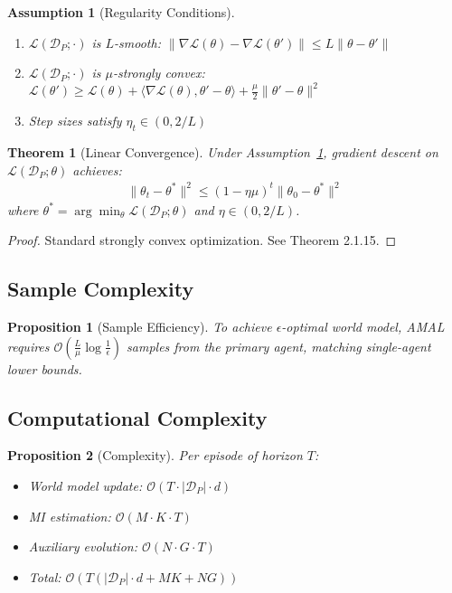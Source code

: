 \documentclass[12pt, a4paper]{article}
\newtheorem{theorem}{Theorem}
\newtheorem{proposition}{Proposition}
\newtheorem{assumption}{Assumption}
\begin{document}
\begin{assumption}[Regularity Conditions]\label{ass:regularity}
\begin{enumerate}
\item $\mathcal{L}(\mathcal{D}_P; \cdot)$ is $L$-smooth: $\|\nabla \mathcal{L}(\theta) - \nabla \mathcal{L}(\theta')\| \leq L\|\theta - \theta'\|$
\item $\mathcal{L}(\mathcal{D}_P; \cdot)$ is $\mu$-strongly convex: $\mathcal{L}(\theta') \geq \mathcal{L}(\theta) + \langle\nabla\mathcal{L}(\theta), \theta'-\theta\rangle + \frac{\mu}{2}\|\theta'-\theta\|^2$
\item Step sizes satisfy $\eta_t \in (0, 2/L)$
\end{enumerate}
\end{assumption}

\begin{theorem}[Linear Convergence]\label{thm:convergence}
Under Assumption~\ref{ass:regularity}, gradient descent on $\mathcal{L}(\mathcal{D}_P; \theta)$ achieves:
\begin{align}
\|\theta_t - \theta^*\|^2 \leq (1 - \eta\mu)^t \|\theta_0 - \theta^*\|^2
\end{align}
where $\theta^* = \arg\min_\theta \mathcal{L}(\mathcal{D}_P; \theta)$ and $\eta \in (0, 2/L)$.
\end{theorem}

\begin{proof}
Standard strongly convex optimization. See \cite{nesterov2018lectures} Theorem 2.1.15.
\end{proof}

\subsection{Sample Complexity}

\begin{proposition}[Sample Efficiency]
To achieve $\epsilon$-optimal world model, AMAL requires $\mathcal{O}(\frac{L}{\mu} \log \frac{1}{\epsilon})$ samples from the primary agent, matching single-agent lower bounds.
\end{proposition}

\subsection{Computational Complexity}

\begin{proposition}[Complexity]
Per episode of horizon $T$:
\begin{itemize}
\item World model update: $\mathcal{O}(T \cdot |\mathcal{D}_P| \cdot d)$
\item MI estimation: $\mathcal{O}(M \cdot K \cdot T)$
\item Auxiliary evolution: $\mathcal{O}(N \cdot G \cdot T)$
\item Total: $\mathcal{O}(T(|\mathcal{D}_P| \cdot d + MK + NG))$
\end{itemize}
\end{proposition}
\end{document}
